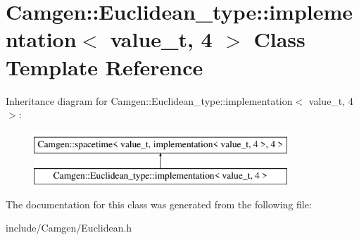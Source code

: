\hypertarget{a00297}{\section{Camgen\-:\-:Euclidean\-\_\-type\-:\-:implementation$<$ value\-\_\-t, 4 $>$ Class Template Reference}
\label{a00297}
}
Inheritance diagram for Camgen\-:\-:Euclidean\-\_\-type\-:\-:implementation$<$ value\-\_\-t, 4 $>$\-:\begin{figure}[H]
\begin{center}
\leavevmode
\includegraphics[height=2.000000cm]{a00297}
\end{center}
\end{figure}


The documentation for this class was generated from the following file\-:\begin{DoxyCompactItemize}
\item 
include/\-Camgen/Euclidean.\-h\end{DoxyCompactItemize}
